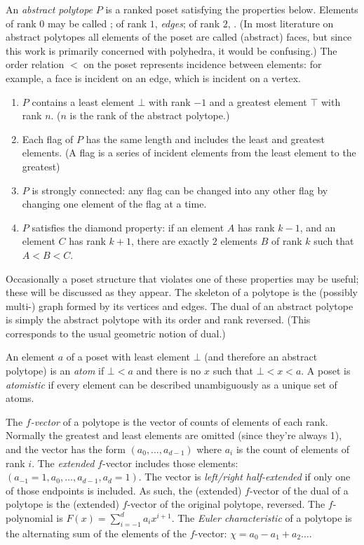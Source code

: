 \documentclass{amsart}[12pt]
\begin{document}
An \textit{abstract polytope} $P$ is a ranked poset satisfying the properties
below. Elements of rank $0$ may be called ; of rank $1$,
\textit{edges}; of rank $2$, . (In most literature on abstract
polytopes all elements of the poset are called (abstract) faces, but since this
work is primarily concerned with polyhedra, it would be confusing.) The order
relation $<$ on the poset represents incidence between elements: for example,
a face is incident on an edge, which is incident on a vertex.\cite{mcmullen}
\begin{enumerate}
  \item $P$ contains a least element $\bot$ with rank $-1$ and a greatest
  element $\top$ with rank $n$. ($n$ is the rank of the abstract polytope.)
  \item Each flag of $P$ has the same length and includes the least and greatest
  elements. (A flag is a series of incident elements from the least element to
  the greatest)
  \item $P$ is strongly connected: any flag can be changed into any other flag
  by changing one element of the flag at a time.
  \item $P$ satisfies the diamond property: if an element $A$ has rank $k-1$,
  and an element $C$ has rank $k+1$, there are exactly $2$ elements $B$ of
  rank $k$ such that $A < B < C$.
\end{enumerate}
Occasionally a poset structure that violates one of these properties may be
useful; these will be discussed as they appear. The skeleton of a polytope is
the (possibly multi-) graph formed by its vertices and edges.
The dual of an abstract polytope is simply the abstract polytope with its order
and rank reversed. (This corresponds to the usual geometric notion of dual.)

An element $a$ of a poset with least element $\bot$ (and therefore an abstract
polytope) is an \textit{atom} if $\bot < a$ and there is no $x$ such that
$\bot < x < a$. A poset is \textit{atomistic} if every
element can be described unambiguously as a unique set of atoms.

The $f$\textit{-vector} of a polytope is the vector of counts of elements of
each rank. Normally the greatest and least elements are omitted (since they're
always 1), and the vector has the form $(a_0, \ldots, a_{d-1})$ where $a_i$ is
the count of elements of rank $i$. The \textit{extended} $f$-vector includes
those elements: $(a_{-1}=1, a_0, \ldots, a_{d-1}, a_d=1)$. The vector is
\textit{left/right half-extended} if only one of those endpoints is included.
As such, the (extended) $f$-vector of the dual of a polytope is the (extended)
$f$-vector of the original polytope, reversed. The $f$-polynomial is
$F(x) = \sum_{i=-1}^d a_i x^{i+1}$. The \textit{Euler characteristic} of a
polytope is the alternating sum of the elements of the $f$-vector:
$\chi = a_0 - a_1 + a_2 \ldots$.
\end{document}
